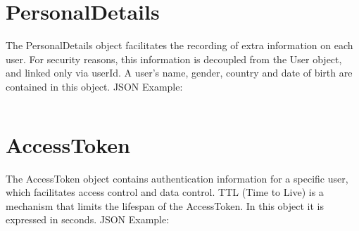 \section{PersonalDetails}
The PersonalDetails object facilitates the recording of extra information on each user. For security reasons, this information is decoupled from the User object, and linked only via userId. A user's name, gender, country and date of birth are contained in this object. JSON Example: \inputminted{json}{Files/prevention-study-1/code/personaldetails.json}

\section{AccessToken}
The AccessToken object contains authentication information for a specific user, which facilitates  access control and data control. TTL (Time to Live) is a mechanism that limits the lifespan of the AccessToken. In this object it is expressed in seconds. JSON Example: \inputminted{json}{Files/prevention-study-1/code/accesstoken.json}

